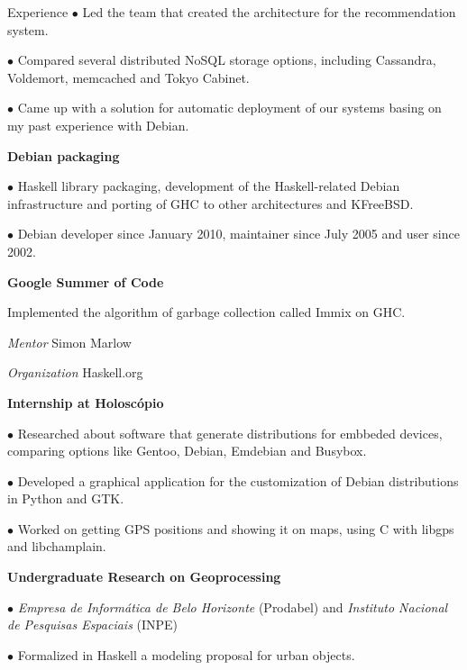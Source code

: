 \begin {rubric} {Experience}
$\bullet$ Led the team that created the architecture for the recommendation
system.

$\bullet$ Compared several distributed NoSQL storage options, including
Cassandra, Voldemort, memcached and Tokyo Cabinet.

$\bullet$ Came up with a solution for automatic deployment of our systems basing
on my past experience with Debian.

\entry* [2005-2011]
\textbf {Debian packaging}

$\bullet$ Haskell library packaging, development of the Haskell-related Debian
infrastructure and porting of GHC to other architectures and KFreeBSD.

$\bullet$ Debian developer since January 2010, maintainer since July 2005 and
user since 2002.

\entry* [05/2012-08/2010]
\textbf{Google Summer of Code}

Implemented the algorithm of garbage collection called Immix on GHC.

\textit{Mentor} Simon Marlow

\textit{Organization} Haskell.org

\entry* [10/2008-08/2009]
\textbf {Internship at Holoscópio}

$\bullet$ Researched about software that generate distributions for embbeded
devices, comparing options like Gentoo, Debian, Emdebian and Busybox.

$\bullet$ Developed a graphical application for the customization of Debian
distributions in Python and GTK.

$\bullet$ Worked on getting GPS positions and showing it on maps, using C with libgps and libchamplain.

\entry* [08/2004-10/2007]
\textbf {Undergraduate Research on Geoprocessing}

$\bullet$ \emph{Empresa de Informática de Belo
    Horizonte} (Prodabel) and \emph{Instituto Nacional
  de Pesquisas Espaciais} (INPE)

$\bullet$ Formalized in Haskell a modeling proposal for urban objects.

\end {rubric}
